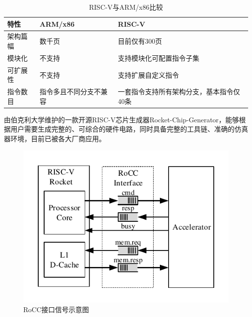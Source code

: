     \begin{table}[h] %
        \label{riscv_compare}
        \centering
        \caption{RISC-V与ARM/x86比较} %
        \begin{tabular}{l|l|l} %
        \hline  
        特性 & ARM/x86 & RISC-V \\
        \hline %
        架构篇幅 & 数千页  & 目前仅有300页 \\
        \hline  
        模块化 & 不支持  & 支持模块化可配置指令子集 \\
        \hline  
        可扩展性 & 不支持 & 支持扩展自定义指令 \\
        \hline  
        指令数目 & 指令多且不同分支不兼容 & 一套指令支持所有架构分支，基本指令仅40条 \\
        \hline  
        \end{tabular}  
    \end{table}

    由伯克利大学维护的一款开源RISC-V芯片生成器Rocket-Chip-Generator，能够根据用户需要生成完整的、可综合的硬件电路，同时具备完整的工具链、准确的仿真器环境，目前已被各大厂商应用。

    \begin{figure}[h]
        \label{rocc}
        \centering
        \includegraphics{../pdf/rocc.pdf}
        \caption{RoCC接口信号示意图}
        \label{}
    \end{figure}

